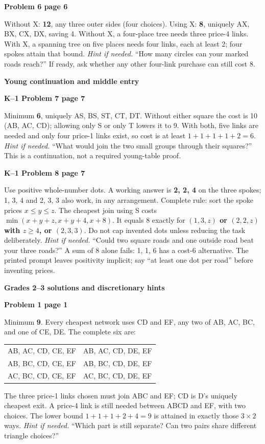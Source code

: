 \documentclass[11pt]{article}
\newcommand{\head}[1]{\par{\large\bfseries #1}\par}
\newcommand{\sub}[1]{\par\textbf{#1}\par}
\newcommand{\hint}[1]{\textit{Hint if needed.} #1}
\begin{document}
\sub{Problem 6 page 6}
Without X: \textbf{12}, any three outer sides (four choices). Using X: \textbf{8}, uniquely AX, BX, CX, DX, saving 4. Without X, a four-place tree needs three price-4 links. With X, a spanning tree on five places needs four links, each at least 2; four spokes attain that bound. \hint{``How many circles can your marked roads reach?''} If ready, ask whether any other four-link purchase can still cost 8.

\newpage
\head{Young continuation and middle entry}
\sub{K--1 Problem 7 page 7}
Minimum \textbf{6}, uniquely AS, BS, ST, CT, DT. Without either square the cost is 10 (AB, AC, CD); allowing only S or only T lowers it to 9. With both, five links are needed and only four price-1 links exist, so cost is at least $1+1+1+1+2=6$. \hint{``What would join the two small groups through their squares?''} This is a continuation, not a required young-table proof.

\sub{K--1 Problem 8 page 7}
Use positive whole-number dots. A working answer is \textbf{2, 2, 4} on the three spokes; 1, 3, 4 and 2, 3, 3 also work, in any arrangement. Complete rule: sort the spoke prices $x\le y\le z$. The cheapest join using S costs $\min(x+y+z,x+y+4,x+8)$. It equals 8 exactly for \textbf{$(1,3,z)$ or $(2,2,z)$ with $z\ge4$, or $(2,3,3)$}. Do not cap invented dots unless reducing the task deliberately. \hint{``Could two square roads and one outside road beat your three roads?''} A sum of 8 alone fails: 1, 1, 6 has a cost-6 alternative. The printed prompt leaves positivity implicit; say ``at least one dot per road'' before inventing prices.
\head{Grades 2--3 solutions and discretionary hints}
\sub{Problem 1 page 1}
Minimum \textbf{9}. Every cheapest network uses CD and EF, any two of AB, AC, BC, and one of CE, DE. The complete six are:
\begin{center}\small
\begin{tabular}{ll}
AB, AC, CD, CE, EF & AB, AC, CD, DE, EF\\
AB, BC, CD, CE, EF & AB, BC, CD, DE, EF\\
AC, BC, CD, CE, EF & AC, BC, CD, DE, EF
\end{tabular}
\end{center}
The three price-1 links chosen must join ABC and EF; CD is D's uniquely cheapest exit. A price-4 link is still needed between ABCD and EF, with two choices. The lower bound $1+1+1+2+4=9$ is attained in exactly those $3\times2$ ways. \hint{``Which part is still separate? Can two pairs share different triangle choices?''}
\end{document}
